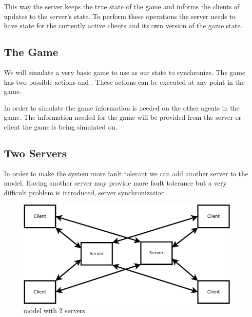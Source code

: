 	This way the server keeps the true state of the game and informs the clients of updates to the server's state. To perform these operations the server needs to have state for the currently active clients and its own version of the game state.

\subsection{The Game}

	We will simulate a very basic game to use as our state to synchronize. 
	The game has two possible actions \move{\agent}{\position} and . These actions can be executed at any point in the game. 
	
	In order to simulate the game information is needed on the other agents in the game. The information needed for the game will be provided from the server or client the game is being simulated on. 
	
	
\subsection{Two Servers}

	In order to make the system more fault tolerant we can add another server to the \clientServer model. Having another server may provide more fault tolerance but a very difficult problem is introduced, server synchronization.
	
	\begin{figure}[ht]
		\includegraphics[width=0.95\linewidth]{../images/client-2server-model-crop.pdf}
		\caption{\label{figure:Client-2Server} \clientServer model with 2 servers.}
	\end{figure}
	
